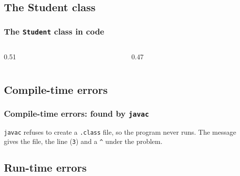 \documentclass[aspectratio=169,10pt,compress]{beamer}
\begin{document}
\subsection[Student]{The Student class}




\begin{frame}[t,fragile] \frametitle{The \texttt{Student} class in code}
  \begin{columns}[T]
    \begin{column}{0.51\textwidth}
    \end{column}
    \begin{column}{0.47\textwidth}
    \end{column}
  \end{columns}
\end{frame}


\subsection[Compile]{Compile-time errors}




\begin{frame}[t,fragile] \frametitle{Compile-time errors: found by \texttt{javac}}

  \small \texttt{javac} refuses to create a \texttt{.class} file, so the program never runs.
  The message gives the file, the line (\texttt{3}) and a \texttt{\^{}} under the problem.
\end{frame}

\subsection[Runtime]{Run-time errors}
\end{document}
